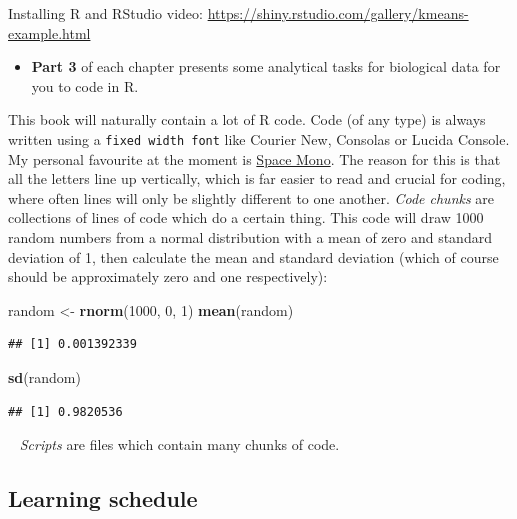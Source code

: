 \documentclass[
]{book}
\newenvironment{Shaded}{\begin{snugshade}}{\end{snugshade}}
\newcommand{\DecValTok}[1]{\textcolor[rgb]{0.00,0.00,0.81}{#1}}
\newcommand{\KeywordTok}[1]{\textcolor[rgb]{0.13,0.29,0.53}{\textbf{#1}}}
\newcommand{\NormalTok}[1]{#1}
\newcommand{\StringTok}[1]{\textcolor[rgb]{0.31,0.60,0.02}{#1}}
\providecommand{\tightlist}{%
  \setlength{\itemsep}{0pt}\setlength{\parskip}{0pt}}
\begin{document}
Installing R and RStudio video: \url{https://shiny.rstudio.com/gallery/kmeans-example.html}
~

\begin{itemize}
\tightlist
\item
  \textbf{Part 3} of each chapter presents some analytical tasks for biological data
  for you to code in R.\\
  \hspace*{0.333em}
\end{itemize}

This book will naturally contain a lot of R code. Code (of any type)
is always written using a \texttt{fixed\ width\ font} like Courier New, Consolas or
Lucida Console. My personal favourite at the moment is
\href{https://fonts.google.com/specimen/Space+Mono}{Space Mono}. The reason for this
is that all the letters line up vertically, which is far easier to read and crucial
for coding, where often lines will only be slightly different to one another.
\emph{Code chunks} are collections of lines of code which do a certain thing. This
code will draw 1000 random numbers from a normal distribution with a mean of zero
and standard deviation of 1, then calculate the mean and standard deviation
(which of course should be approximately zero and one respectively):

\begin{Shaded}
\begin{Highlighting}[]
\NormalTok{random <-}\StringTok{ }\KeywordTok{rnorm}\NormalTok{(}\DecValTok{1000}\NormalTok{, }\DecValTok{0}\NormalTok{, }\DecValTok{1}\NormalTok{)}
\KeywordTok{mean}\NormalTok{(random)}
\end{Highlighting}
\end{Shaded}

\begin{verbatim}
## [1] 0.001392339
\end{verbatim}

\begin{Shaded}
\begin{Highlighting}[]
\KeywordTok{sd}\NormalTok{(random)}
\end{Highlighting}
\end{Shaded}

\begin{verbatim}
## [1] 0.9820536
\end{verbatim}

~
\emph{Scripts} are files which contain many chunks of code.

\hypertarget{learning-schedule}{%
\subsection{Learning schedule}\label{learning-schedule}}
\end{document}
